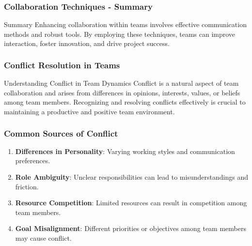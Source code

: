 \documentclass[aspectratio=169]{beamer}
\begin{document}
\begin{frame}[fragile]
    \frametitle{Collaboration Techniques - Summary}
    \begin{block}{Summary}
        Enhancing collaboration within teams involves effective communication methods and robust tools. By employing these techniques, teams can improve interaction, foster innovation, and drive project success.
    \end{block}
\end{frame}

\begin{frame}[fragile]
    \frametitle{Conflict Resolution in Teams}
    \begin{block}{Understanding Conflict in Team Dynamics}
        Conflict is a natural aspect of team collaboration and arises from differences in opinions, interests, values, or beliefs among team members. Recognizing and resolving conflicts effectively is crucial to maintaining a productive and positive team environment.
    \end{block}
\end{frame}

\begin{frame}[fragile]
    \frametitle{Common Sources of Conflict}
    \begin{enumerate}
        \item \textbf{Differences in Personality}: Varying working styles and communication preferences.
        \item \textbf{Role Ambiguity}: Unclear responsibilities can lead to misunderstandings and friction.
        \item \textbf{Resource Competition}: Limited resources can result in competition among team members.
        \item \textbf{Goal Misalignment}: Different priorities or objectives among team members may cause conflict.
    \end{enumerate}
\end{frame}
\end{document}
